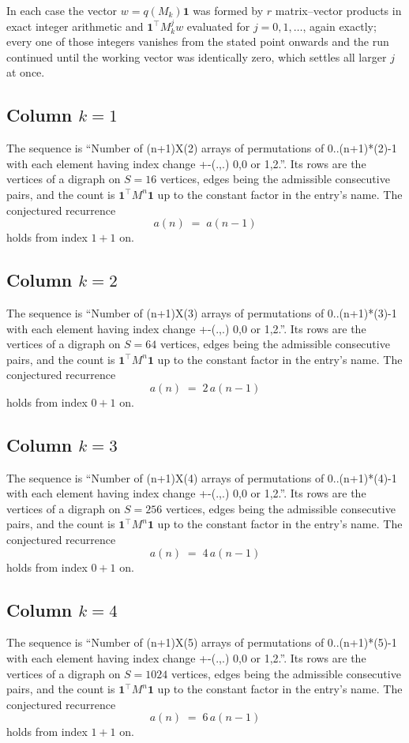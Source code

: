 \documentclass[11pt,a4paper]{article}
\theoremstyle{plain}
\theoremstyle{definition}
\begin{document}
In each case the vector $w=q(M_k)\mathbf{1}$ was formed by $r$ matrix--vector products in
exact integer arithmetic and $\mathbf{1}^{\!\top}M_k^{j}w$ evaluated for $j=0,1,\dots$,
again exactly; every one of those integers vanishes from the stated point onwards and the run
continued until the working vector was identically zero, which settles all larger $j$ at once.

\subsection*{Column $k$$=1$}
The sequence is ``Number of (n+1)X(2) arrays of permutations of 0..(n+1)*(2)-1 with each element having index change +-(.,.) 0,0 or 1,2.''. Its rows are the vertices of a digraph on
$S=16$ vertices, edges being the admissible consecutive pairs, and the count is
$\mathbf{1}^{\!\top}M^{n}\mathbf{1}$ up to the constant factor in the entry's name.
The conjectured recurrence
\[
a(n)\;=\;a(n-1)
\]
holds from index $1+1$ on.

\subsection*{Column $k$$=2$}
The sequence is ``Number of (n+1)X(3) arrays of permutations of 0..(n+1)*(3)-1 with each element having index change +-(.,.) 0,0 or 1,2.''. Its rows are the vertices of a digraph on
$S=64$ vertices, edges being the admissible consecutive pairs, and the count is
$\mathbf{1}^{\!\top}M^{n}\mathbf{1}$ up to the constant factor in the entry's name.
The conjectured recurrence
\[
a(n)\;=\;2\,a(n-1)
\]
holds from index $0+1$ on.

\subsection*{Column $k$$=3$}
The sequence is ``Number of (n+1)X(4) arrays of permutations of 0..(n+1)*(4)-1 with each element having index change +-(.,.) 0,0 or 1,2.''. Its rows are the vertices of a digraph on
$S=256$ vertices, edges being the admissible consecutive pairs, and the count is
$\mathbf{1}^{\!\top}M^{n}\mathbf{1}$ up to the constant factor in the entry's name.
The conjectured recurrence
\[
a(n)\;=\;4\,a(n-1)
\]
holds from index $0+1$ on.

\subsection*{Column $k$$=4$}
The sequence is ``Number of (n+1)X(5) arrays of permutations of 0..(n+1)*(5)-1 with each element having index change +-(.,.) 0,0 or 1,2.''. Its rows are the vertices of a digraph on
$S=1024$ vertices, edges being the admissible consecutive pairs, and the count is
$\mathbf{1}^{\!\top}M^{n}\mathbf{1}$ up to the constant factor in the entry's name.
The conjectured recurrence
\[
a(n)\;=\;6\,a(n-1)
\]
holds from index $1+1$ on.
\end{document}
